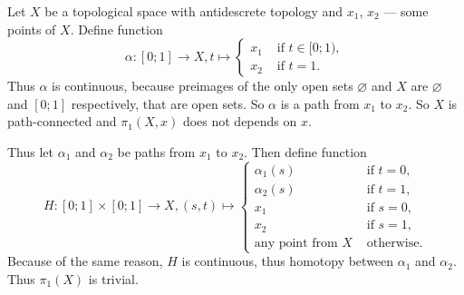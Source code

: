 \documentclass[12pt,a4paper]{article}
\begin{document}
    \begin{enumproblem}
        Let $X$ be a topological space with antidescrete topology and $x_1$, $x_2$ --- some points of $X$. Define function
        \[
            \alpha: [0; 1] \to X, t \mapsto
            \begin{cases}
                x_1& \text{ if } t \in [0; 1),\\
                x_2& \text{ if } t = 1.
            \end{cases}
        \]
        Thus $\alpha$ is continuous, because preimages of the only open sets $\varnothing$ and $X$ are $\varnothing$ and $[0; 1]$ respectively, that are open sets. So $\alpha$ is a path from $x_1$ to $x_2$. So $X$ is path-connected and $\pi_1(X, x)$ does not depends on $x$.

        Thus let $\alpha_1$ and $\alpha_2$ be paths from $x_1$ to $x_2$. Then define function
        \[
            H: [0; 1] \times [0; 1] \to X, (s, t) \mapsto
            \begin{cases}
                \alpha_1(s)& \text{ if } t = 0,\\
                \alpha_2(s)& \text{ if } t = 1,\\
                x_1& \text{ if } s = 0,\\
                x_2& \text{ if } s = 1,\\
                \text{any point from } X& \text{ otherwise}.
            \end{cases}
        \]
        Because of the same reason, $H$ is continuous, thus homotopy between $\alpha_1$ and $\alpha_2$. Thus $\pi_1(X)$ is trivial. 
    \end{enumproblem}
\end{document}
